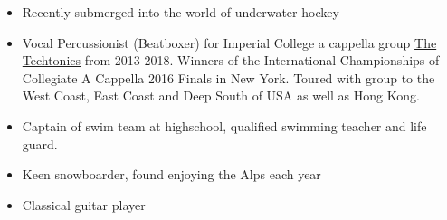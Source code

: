 
\medskip
\begin{itemize}
    \newline
    \item Recently submerged into the world of underwater hockey
    \item Vocal Percussionist (Beatboxer) for Imperial College a cappella group \href{http://www.thetechtonics.co.uk/}{The Techtonics}
    from 2013-2018. \newline
    Winners of the International Championships of Collegiate A Cappella 2016 Finals in New York. \newline
    Toured with group to the West Coast, East Coast and Deep South of USA as well as Hong Kong.
    \item Captain of swim team at highschool, qualified swimming teacher and life guard.
    \item Keen snowboarder, found enjoying the Alps each year
    \item Classical guitar player
    \emptySeparator
\end{itemize}
